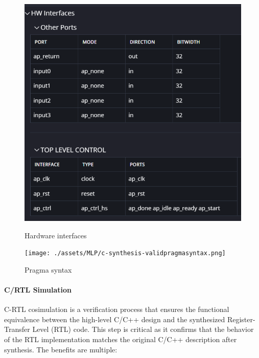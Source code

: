\documentclass{article}
\begin{document}
\begin{figure}[H]
    \centering
    \begin{minipage}{0.49\textwidth}
        \centering
        \includegraphics[width=1\textwidth]{./assets/MLP/c-synthesis-HWinterfaces.png}
        \caption{Hardware interfaces}
        \label{fig:c-synthesis-hw-interfaces}
    \end{minipage}
    \hfill
    \begin{minipage}{0.49\textwidth}
        \centering
        \texttt{[image: ./assets/MLP/c-synthesis-validpragmasyntax.png]}
        \caption{Pragma syntax}
        \label{fig:c-synthesis-pragma-syntax}
    \end{minipage}
\end{figure}


\paragraph{C/RTL Simulation}

C-RTL cosimulation is a verification process that ensures the functional equivalence between the high-level C/C++ design and the synthesized Register-Transfer Level (RTL) code. This step is critical as it confirms that the behavior of the RTL implementation matches the original C/C++ description after synthesis. The benefits are multiple:
\end{document}
